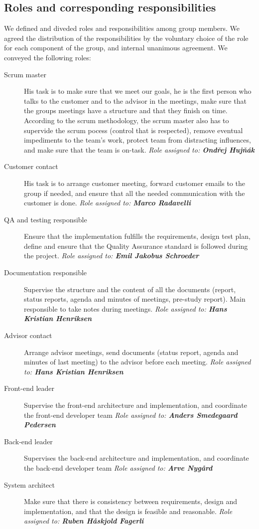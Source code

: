 \documentclass[11pt,a4paper,titlepage,oneside]{report}
\begin{document}
\subsection{Roles and corresponding responsibilities}
We defined and diveded roles and responsibilities among group members. We agreed the distribution of the responsibilities by the voluntary choice of the role for each component of the group, and internal unanimous agreement.
We conveyed the following roles:
\begin{description}
\item[Scrum master] His task is to make sure that we meet our goals, he is the first person who talks to the customer and to the advisor in the meetings, make sure that the groups meetings have a structure and that they finish on time. According to the scrum methodology, the scrum master also has to supervide the scrum pocess (control that is respected), remove eventual impediments to the team's work, protect team from distracting influences, and make sure that the team is on-task.
\emph{Role assigned to: \textbf{Ondřej Hujňák}}
\item[Customer contact] His task is to arrange customer meeting, forward customer emails to the group if needed, and ensure that all the needed communication with the customer is done.
\emph{Role assigned to: \textbf{Marco Radavelli}}
\item[QA and testing responsible] Ensure that the implementation fulfills the requirements, design test plan, define and ensure that the Quality Assurance standard is followed during the project.
\emph{Role assigned to: \textbf{Emil Jakobus Schroeder}}
\item[Documentation responsible] Supervise the structure and the content of all the documents (report, status reports, agenda and minutes of meetings, pre-study report). Main responsible to take notes during meetings. 
\emph{Role assigned to: \textbf{Hans Kristian Henriksen}}
\item[Advisor contact] Arrange advisor meetings, send documents (status report, agenda and minutes of last meeting) to the advisor before each meeting.
\emph{Role assigned to: \textbf{Hans Kristian Henriksen}}
\item[Front-end leader] Supervise the front-end architecture and implementation, and coordinate the front-end developer team
\emph{Role assigned to: \textbf{Anders Smedegaard Pedersen}}
\item[Back-end leader] Supervises the back-end architecture and implementation, and coordinate the back-end developer team
\emph{Role assigned to: \textbf{Arve Nygård}}
\item[System architect] Make sure that there is consistency between requirements, design and implementation, and that the design is feasible and reasonable.
\emph{Role assigned to: \textbf{Ruben Håskjold Fagerli}}
\end{description}
\end{document}
